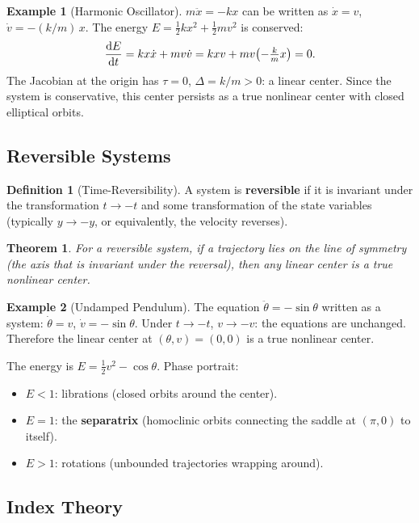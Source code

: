 \documentclass[11pt,letterpaper]{article}
\theoremstyle{definition}
\newtheorem{definition}{Definition}[section]
\newtheorem{example}{Example}[section]
\theoremstyle{plain}
\newtheorem{theorem}{Theorem}[section]
\theoremstyle{remark}
\begin{document}
\begin{example}[Harmonic Oscillator]
$m\ddot{x} = -kx$ can be written as
$\dot{x} = v$, $\dot{v} = -(k/m)\,x$.  The energy
$E = \tfrac{1}{2}kx^2 + \tfrac{1}{2}mv^2$
is conserved:
\[
  \dv{E}{t} = kx\dot{x} + mv\dot{v} = kxv + mv\bigl(-\tfrac{k}{m}x\bigr) = 0.
\]
The Jacobian at the origin has $\tau=0$, $\Delta=k/m>0$: a linear center.
Since the system is conservative, this center persists as a true nonlinear
center with closed elliptical orbits.
\end{example}

\subsection{Reversible Systems}\label{sec:reversible}

\begin{definition}[Time-Reversibility]
A system is \textbf{reversible} if it is invariant under the transformation
$t\to -t$ and some transformation of the state variables (typically
$y\to -y$, or equivalently, the velocity reverses).
\end{definition}

\begin{theorem}
For a reversible system, if a trajectory lies on the line of symmetry (the
axis that is invariant under the reversal), then any linear center is a
\emph{true} nonlinear center.
\end{theorem}

\begin{example}[Undamped Pendulum]
The equation $\ddot{\theta} = -\sin\theta$ written as a system:
$\dot{\theta} = v$, $\dot{v} = -\sin\theta$.
Under $t\to -t$, $v\to -v$: the equations are unchanged.  Therefore the
linear center at $(\theta,v)=(0,0)$ is a true nonlinear center.

The energy is $E = \tfrac{1}{2}v^2 - \cos\theta$.  Phase portrait:
\begin{itemize}[leftmargin=2em]
\item $E < 1$: librations (closed orbits around the center).
\item $E = 1$: the \textbf{separatrix} (homoclinic orbits connecting the
      saddle at $(\pi,0)$ to itself).
\item $E > 1$: rotations (unbounded trajectories wrapping around).
\end{itemize}
\end{example}

\subsection{Index Theory}\label{sec:index-theory}
\end{document}

